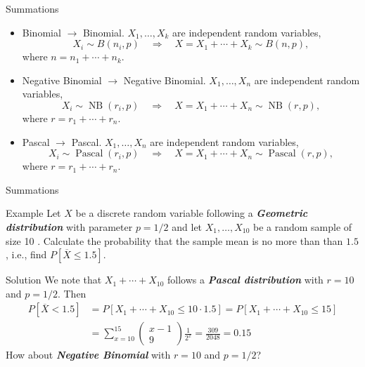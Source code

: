 \documentclass{beamer}
\newcommand{\bb}[1]{\textcolor{antiquefuchsia}{\textbf{\textit{#1}}}}
\begin{document}
\begin{frame}{Summations}
\begin{itemize}
\item Binomial $\rightarrow$ Binomial. $X_{1}, \ldots, X_{k}$ are independent random variables,
$$
X_{i} \sim B\left(n_{i}, p\right) \quad \Rightarrow \quad X=X_{1}+\cdots+X_{k} \sim B(n, p),
$$
where $n=n_{1}+\cdots+n_{k}$.

\item Negative Binomial $\rightarrow$ Negative Binomial. $X_{1}, \ldots, X_{n}$ are independent random variables,
$$
X_{i} \sim \operatorname{NB}\left(r_{i}, p\right) \quad \Rightarrow \quad X=X_{1}+\cdots+X_{n} \sim \operatorname{NB}(r, p),
$$
where $r=r_{1}+\cdots+r_{n}$.

\item Pascal $\rightarrow$ Pascal. $X_{1}, \ldots, X_{n}$ are independent random variables,
$$
X_{i} \sim \operatorname{Pascal}\left(r_{i}, p\right) \quad \Rightarrow \quad X=X_{1}+\cdots+X_{n} \sim \operatorname{Pascal}(r, p),
$$
where $r=r_{1}+\cdots+r_{n}$.
\end{itemize}
\end{frame}


\begin{frame}{Summations}
\begin{block}{Example}
Let $X$ be a discrete random variable following a \bb{Geometric distribution} with parameter $p=1 / 2$ and let $X_{1}, \ldots, X_{10}$ be a random sample of size 10 . Calculate the probability that the sample mean is no more than than $1.5$, i.e., find
$
P[\overline{X} \leq 1.5]
$.
\end{block}
\pause
\begin{block}{Solution}
We note that $X_{1}+\cdots+X_{10}$ follows a \bb{Pascal distribution} with $r=10$ and $p=1 / 2$.
Then
$$
\begin{aligned}
P[\overline{X}<1.5] &=P\left[X_{1}+\cdots+X_{10} \leq 10 \cdot 1.5\right]
=P\left[X_{1}+\cdots+X_{10} \leq 15\right] \\
&=\sum_{x=10}^{15}\left(\begin{array}{c}
x-1 \\
9
\end{array}\right) \frac{1}{2^{x}} =\frac{309}{2048}=0.15
\end{aligned}
$$
How about \bb{Negative Binomial} with $r=10$ and $p=1/2$?
\end{block}
\end{frame}
\end{document}
